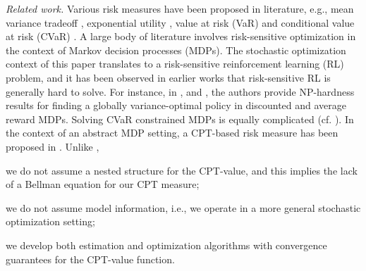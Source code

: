 %
%


\textit{Related work.}
Various risk measures have been proposed in literature, e.g., mean variance tradeoff \cite{markowitz1952portfolio}, exponential utility \cite{Arrow1971}, value at risk (VaR) and conditional value at risk (CVaR) \cite{rockafellar2000optimization}. A large body of literature involves risk-sensitive optimization in the context of Markov decision processes (MDPs).   
The stochastic optimization context of this paper translates to a risk-sensitive reinforcement learning (RL) problem, and it has been observed in earlier works that risk-sensitive RL is generally hard to solve. 
For instance, in \cite{Sobel82VD}, \cite{filar1989variance} and \cite{mannor2013algorithmic}, the authors provide NP-hardness results for finding a globally variance-optimal policy in discounted and average reward MDPs.
Solving CVaR constrained MDPs is equally complicated (cf. \cite{borkar2010risk,prashanth2014policy,tamar2014optimizing}). 
In the context of an abstract MDP setting, a CPT-based risk measure has been proposed in \cite{lin2013stochastic}. Unlike \cite{lin2013stochastic},
\begin{inparaenum}[\it (i)]
\item we do not assume a nested structure for the CPT-value, %
and this implies the lack of a Bellman equation for our CPT measure;
\item we do not assume model information, i.e., we operate in a more general stochastic optimization setting;
\item we develop both estimation and optimization algorithms with convergence guarantees for the CPT-value function.
\end{inparaenum}

